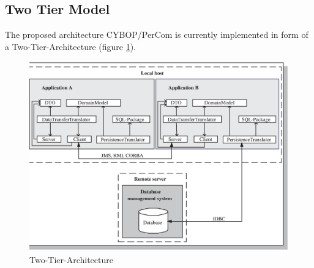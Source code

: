 \subsection{Two Tier Model}
\label{two_tier_model_section}

The proposed architecture CYBOP/PerCom is currently implemented in form of a
Two-Tier-Architecture (figure \ref{two_tier_architecture_figure}).

\begin{figure}[ht]
    \begin{center}
       \includegraphics[scale=0.4]{images/client_server_communication.eps}
       \caption{Two-Tier-Architecture}
       \label{two_tier_architecture_figure}
    \end{center}
\end{figure}

